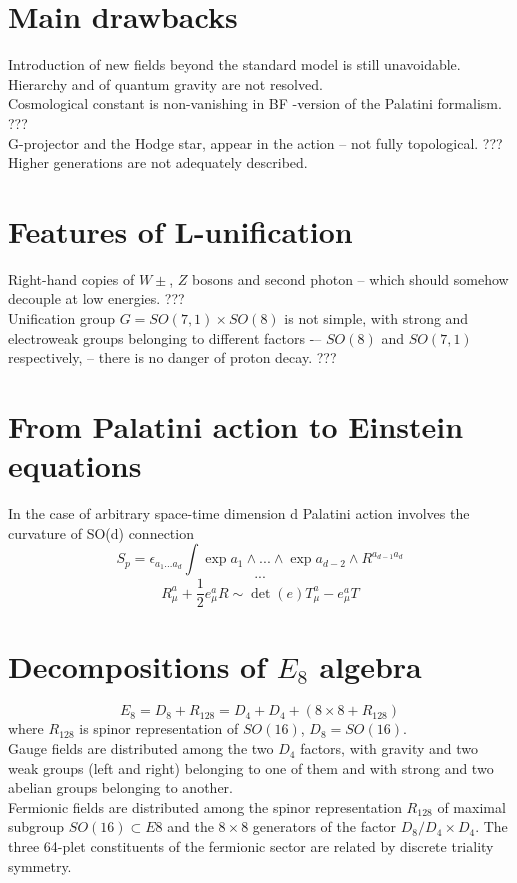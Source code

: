 \documentclass{article}
\begin{document}
\newpage
\section{Main drawbacks}
Introduction of new fields beyond the standard model is still unavoidable. \\
Hierarchy and of quantum gravity are not resolved. \\
Cosmological constant is non-vanishing in BF -version of the Palatini formalism. ???\\
G-projector and the Hodge star, appear in the action -- not fully topological. ???\\
Higher generations are not adequately described. \\

\section{Features of L-unification}
Right-hand copies of $W±$, $Z$ bosons and second photon – which should somehow decouple at low energies. ??? \\
Unification group $G = SO(7, 1) \times SO(8)$ is not simple, with strong and electroweak groups belonging to different factors -– $SO(8)$ and $SO(7, 1)$ respectively, – there is no danger of proton decay. ???\\

\section{From Palatini action to Einstein equations}
In the case of arbitrary space-time dimension d Palatini action involves the curvature of SO(d) connection
\begin{equation}
    S_p = \epsilon_{a_1 ... a_d} \int \exp{a_1} \land ... \land \exp{a_{d-2}} \land R^{a_{d-1}a_d}
\end{equation}
\begin{equation}
    ...
\end{equation}
\begin{equation}
    R_\mu^a + \frac{1}{2}e_\mu^a R \sim \det(e)T_\mu^a - e^a_\mu T
\end{equation}

\newpage
\section{Decompositions of $E_8$ algebra}
\begin{equation}
    E_8 = D_8 + R_{128} = D_4 + D_4 + (8 \times 8 + R_{128})
\end{equation}
where $R_{128}$ is spinor representation of $SO(16)$, $D_8 = SO(16)$. \\

Gauge fields are distributed among the two $D_4$ factors, with gravity and two weak groups (left and right) belonging to one of them and with strong and two abelian groups belonging to another. \\
Fermionic fields are distributed among the spinor representation $R_128$ of maximal subgroup $SO(16) \subset E8$ and the $8 \times 8$ generators of the factor $D_8/D_4 \times D_4$. The three 64-plet constituents of the fermionic sector are related by discrete triality symmetry. \\
\end{document}
